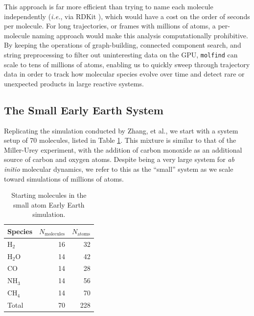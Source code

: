 This approach is far more efficient than trying to name each molecule independently (\textit{i.e.}, via RDKit \cite{rdkit}), which would have a cost on the order of seconds per molecule.
For long trajectories, or frames with millions of atoms, a per-molecule naming approach would make this analysis computationally prohibitive.
By keeping the operations of graph-building, connected component search, and string preprocessing to filter out uninteresting data on the GPU, \verb|molfind| can scale to tens of millions of atoms, enabling us to quickly sweep through trajectory data in order to track how molecular species evolve over time and detect rare or unexpected products in large reactive systems.

\subsection{The Small Early Earth System}
\label{subsec:small_system}

Replicating the simulation conducted by Zhang, et al., we start with a system setup of 70 molecules, listed in Table \ref{tbl:228_sim_counts}.
This mixture is similar to that of the Miller-Urey experiment, with the addition of carbon monoxide as an additional source of carbon and oxygen atoms.
Despite being a very large system for \textit{ab initio} molecular dynamics, we refer to this as the ``small'' system as we scale toward simulations of millions of atoms.

\begin{table}[h!]
\centering
\caption[Starting molecules in 228 atom Early Earth simulation]{Starting molecules in the small atom Early Earth simulation.
}\label{tbl:228_sim_counts}
\begin{tabularx}{0.315\textwidth}{lrr}  
\toprule
Species & $N_\text{molecules}$ & $N_\text{atoms}$ \\
\midrule
$\text{H}_2$ & 16 & 32 \\
$\text{H}_2\text{O}$ & 14 & 42 \\
CO & 14 & 28 \\
$\text{NH}_3$ & 14 & 56 \\ 
$\text{CH}_4$ & 14 & 70 \\
Total & 70 & 228 \\
\bottomrule
\end{tabularx}
\end{table}

